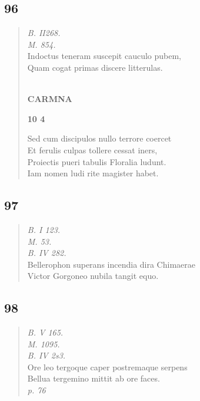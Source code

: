 \documentclass[11pt, a4paper]{report}
\begin{document}
            \subsection*{96}
      \begin{verse}
      \textit{B. II268.} \\ \textit{M. 854.} \\ Indoctus teneram suscepit cauculo pubem, \\ Quam cogat primas discere litterulas. \\ 
        ﻿\pagebreak 
    \begin{center} \textbf{CARMNA} \end{center}\begin{center} \textbf{10 4} \end{center}Sed cum discipulos nullo terrore coercet \\ Et ferulis culpas tollere cessat iners, \\ Proiectis pueri tabulis Floralia ludunt. \\ Iam nomen ludi rite magister habet. \\ 
      \end{verse}
  
            \subsection*{97}
      \begin{verse}
      \textit{B. I 123.} \\ \textit{M. 53.} \\ \textit{B. IV 282.} \\ Bellerophon superans incendia dira Chimaerae \\ Victor Gorgoneo nubila tangit equo. \\ 
      \end{verse}
  
            \subsection*{98}
      \begin{verse}
      \textit{B. V 165.} \\ \textit{M. 1095.} \\ \textit{B. IV 2s3.} \\ Ore leo tergoque caper postremaque serpens \\ Bellua tergemino mittit ab ore faces. \\ \textit{p. 76} \\ 
      \end{verse}
  
\end{document}
